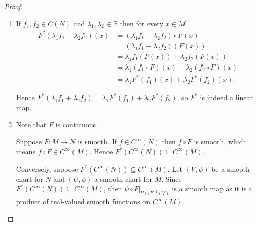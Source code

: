 \begin{proof}
    \begin{enumerate}[label={(\alph*)}]
        \item If \( f_{1}, f_{2} \in C(N) \) and \( \lambda_{1}, \lambda_{2} \in \mathbb{R} \) then for every \( x \in M \)
              \begingroup
              \allowdisplaybreaks%
              \begin{align*}
                  F^{\ast}(\lambda_{1} f_{1} + \lambda_{2} f_{2})(x) & = (\lambda_{1} f_{1} + \lambda_{2} f_{2}) \circ F (x)              \\
                                                                     & = (\lambda_{1} f_{1} + \lambda_{2} f_{2})(F(x))                    \\
                                                                     & = \lambda_{1} f_{1}(F(x)) + \lambda_{2} f_{2}(F(x))                \\
                                                                     & = \lambda_{1} (f_{1} \circ F)(x) + \lambda_{2} (f_{2} \circ F)(x)  \\
                                                                     & = \lambda_{1} F^{\ast}(f_{1})(x) + \lambda_{2} F^{\ast}(f_{2})(x).
              \end{align*}
              \endgroup

              Hence \( F^{\ast}(\lambda_{1} f_{1} + \lambda_{2} f_{2}) = \lambda_{1} F^{\ast}(f_{1}) + \lambda_{2} F^{\ast}(f_{2}) \), so \( F^{\ast} \) is indeed a linear map.
        \item Note that \( F \) is continuous.

              Suppose \( F: M \to N \) is smooth. If \( f \in C^{\infty}(N) \) then \( f \circ F \) is smooth, which means \( f \circ F \in C^{\infty}(M) \). Hence \( F^{\ast}(C^{\infty}(N)) \subseteq C^{\infty}(M) \).

              Conversely, suppose \( F^{\ast}(C^{\infty}(N)) \subseteq C^{\infty}(M) \). Let \( (V, \psi) \) be a smooth chart for \( N \) and \( (U, \phi) \) a smooth chart for \( M \). Since \( F^{\ast}(C^{\infty}(N)) \subseteq C^{\infty}(M) \), then \( \psi \circ F\vert_{U \cap F^{-1}(V)} \) is a smooth map as it is a product of real-valued smooth functions on \( C^{\infty}(M) \).


\end{enumerate}
\end{proof}
